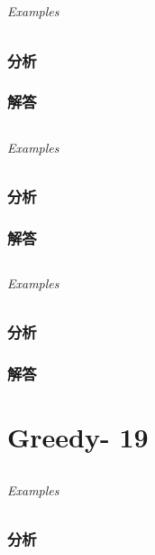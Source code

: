\documentclass[UTF8,a4paper,12pt]{ctexbook}
\begin{document}
\section{}
	
	\subparagraph{Examples}
	
	\subsection{分析}
	
	\subsection{解答}
	
\section{}
	
	\subparagraph{Examples}
	
	\subsection{分析}
	
	\subsection{解答}
	
\section{}
	
	\subparagraph{Examples}
	
	\subsection{分析}
	
	\subsection{解答}
\chapter{Greedy- 19}
\section{}
	
	\subparagraph{Examples}
	
	\subsection{分析}
	
\end{document}
